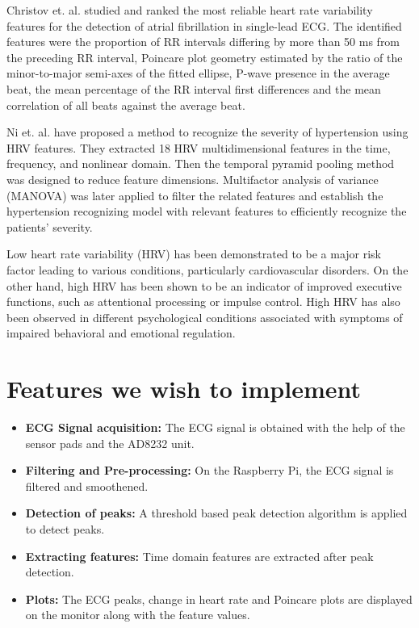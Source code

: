 \documentclass[11pt]{article}
\theoremstyle{definition}
\begin{document}
  Christov et. al. \cite{christov2018ranking} studied and ranked the most reliable heart rate variability features for the detection of atrial fibrillation in single-lead ECG. The identified features were the proportion of RR intervals differing by more than 50 ms from the preceding RR interval, Poincare plot geometry estimated by the ratio of the minor-to-major semi-axes of the fitted ellipse, P-wave presence in the average beat, the mean percentage of the RR interval first differences and the mean correlation of all beats against the average beat.

  Ni et. al.\cite{ni2019multiscale} have proposed a method to recognize the severity of hypertension using HRV features. They extracted 18 HRV multidimensional features in the time, frequency, and nonlinear domain. Then the temporal pyramid pooling method was designed to reduce feature dimensions. Multifactor analysis of variance (MANOVA) was later applied to filter the related features and establish the hypertension recognizing model with relevant features to efficiently recognize the patients’ severity.

  Low heart rate variability (HRV) has been demonstrated to be a major risk factor leading to various conditions, particularly cardiovascular disorders\cite{kamath1987heart}.
  On the other hand, high HRV has been shown to be an indicator of improved executive functions, such as attentional processing or impulse control\cite{appelhans2006heart, thayer2005psychosomatics}.
  High HRV has also been observed in different psychological conditions associated with symptoms of impaired behavioral and emotional regulation\cite{thayer2009claude, schulz2008negative}.


  \section{Features we wish to implement}
  \begin{itemize}
  \item \textbf{ECG Signal acquisition:} The ECG signal is obtained with the help of the sensor pads and the AD8232 unit.
  \item \textbf{Filtering and Pre-processing:} On the Raspberry Pi, the ECG signal is filtered and smoothened.
  \item \textbf{Detection of peaks:} A threshold based peak detection algorithm is applied to detect peaks.
  \item \textbf{Extracting features:} Time domain features are extracted after peak detection.
  \item \textbf{Plots:} The ECG peaks, change in heart rate and Poincare plots are displayed on the monitor along with the feature values.
  \end{itemize}
\end{document}
